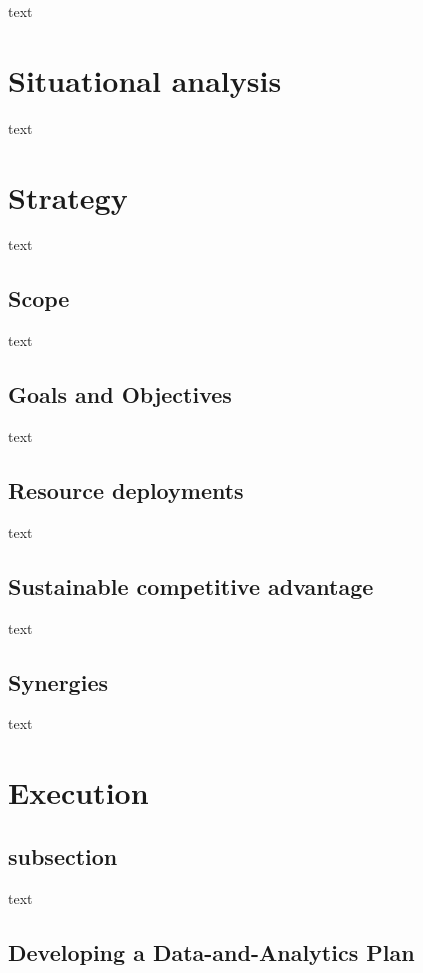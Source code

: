 \documentclass[10pt]{article} %
\begin{document}
text

\section{Situational analysis}
text

\section{Strategy}
text

\subsection{Scope}

text

\subsection{Goals and Objectives}

text

\subsection{Resource deployments}

text

\subsection{Sustainable competitive advantage}

text

\subsection{Synergies}

text


\section{Execution}

\subsection{subsection}

text


\subsection{Developing a Data-and-Analytics Plan}
\end{document}
